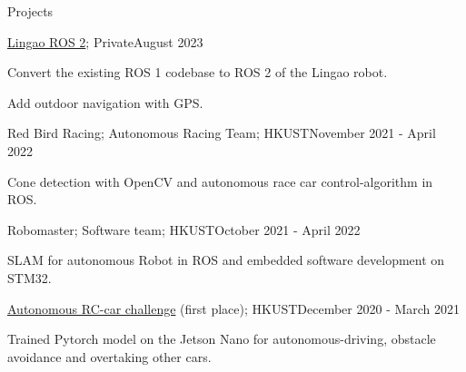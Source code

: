 \documentclass[
	a4paper, %
	11pt, %
]{resume} %
\begin{document}
\begin{rSection}{Projects}

	\begin{rSubsection}{\href{https://github.com/JosefGst/lingao_ros2}{Lingao ROS 2}; Private}{August 2023}{}{}
		\item Convert the existing ROS 1 codebase to ROS 2 of the Lingao robot.
		\item Add outdoor navigation with GPS.
	\end{rSubsection}


	\begin{rSubsection}{Red Bird Racing; Autonomous Racing Team; HKUST}{November 2021 - April 2022}{}{}
		\item Cone detection with OpenCV and autonomous race car control-algorithm in ROS.
	\end{rSubsection}


	\begin{rSubsection}{Robomaster; Software team; HKUST}{October 2021 - April 2022}{}{}
		\item SLAM for autonomous Robot in ROS and embedded software development on STM32.
	\end{rSubsection}


	\begin{rSubsection}{\href{https://github.com/JosefGst/autorace}{Autonomous RC-car challenge} (first place); HKUST}{December 2020 - March 2021}{}{}
		\item Trained Pytorch model on the Jetson Nano for autonomous-driving, obstacle avoidance and overtaking other cars.
	\end{rSubsection}

\end{rSection}






\end{document}
